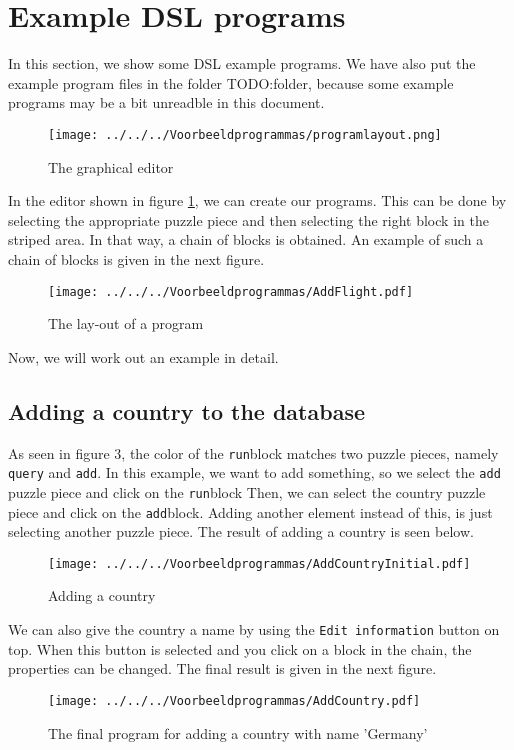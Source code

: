 
\section{Example DSL programs}
In this section, we show some DSL example programs. We have also put the example program files in the folder TODO:folder, because some example programs may be a bit unreadble in this document.

\begin{figure}[H]
	\centering
	\texttt{[image: ../../../Voorbeeldprogrammas/programlayout.png]}
	\caption{The graphical editor}
	\label{ex:DSLlayout}
\end{figure}
\noindent In the editor shown in figure \ref{ex:DSLlayout}, we can create our programs. This can be done by selecting the appropriate puzzle piece and then selecting the right block in the striped area. In that way, a chain of blocks is obtained. An example of such a chain of blocks is given in the next figure.
\begin{figure}[H]
	\centering
	\texttt{[image: ../../../Voorbeeldprogrammas/AddFlight.pdf]}
	\caption{The lay-out of a program}
	\label{ex:generalexample}
\end{figure}
Now, we will work out an example in detail.

\subsection{Adding a country to the database}
As seen in figure 3, the color of the \texttt{run}block matches two puzzle pieces, namely \texttt{query} and \texttt{add}.
In this example, we want to add something, so we select the \texttt{add} puzzle piece and click on the \texttt{run}block Then, we can select the country puzzle piece and click on the \texttt{add}block. Adding another element instead of this, is just selecting another puzzle piece. The result of adding a country is seen below.
\begin{figure}[H]
	\centering
	\texttt{[image: ../../../Voorbeeldprogrammas/AddCountryInitial.pdf]}
	\caption{Adding a country}
	\label{ex:addCountryInitial}
\end{figure}
\noindent We can also give the country a name by using the \texttt{Edit information} button on top. When this button is selected and you click on a block in the chain, the properties can be changed. The final result is given in the next figure.
\begin{figure}[H]
	\centering
	\texttt{[image: ../../../Voorbeeldprogrammas/AddCountry.pdf]}
	\caption{The final program for adding a country with name 'Germany'}
	\label{ex:addCountry}
\end{figure}

